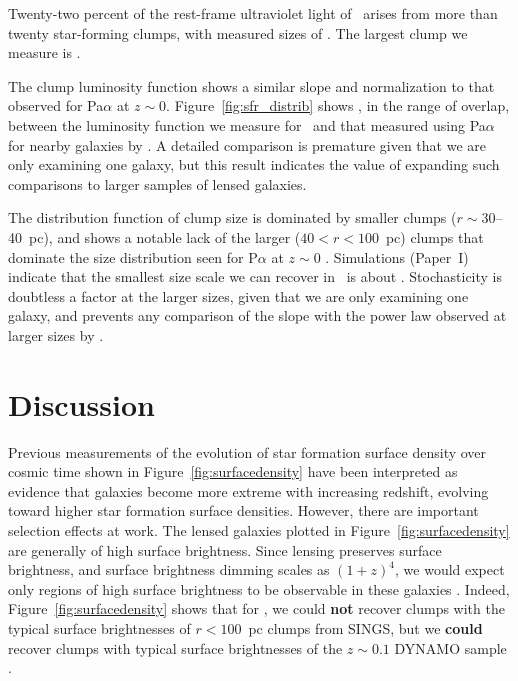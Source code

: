 Twenty-two percent of the rest-frame ultraviolet light of \arcname\ arises from 
more than twenty star-forming clumps, with measured sizes of  \rangeofscales. 
The largest clump we measure is \largestclump.  

The clump luminosity function shows a similar slope 
and normalization to that observed for Pa$\alpha$ at $z\sim0$.  
Figure~\ref{fig:sfr_distrib} shows , 
in the range of overlap, 
between the luminosity function we measure for \arcname\ and that measured
using Pa$\alpha$ for nearby galaxies by \citet{Liu:2013fw}.  A detailed comparison is
premature given that we are only examining one galaxy, but this result
indicates the value of expanding such comparisons to larger samples of lensed galaxies.

 The distribution function of clump size  
is dominated by smaller clumps 
($r\sim 30$--40~pc), and shows a notable lack of the larger ($40<r<100$~pc) clumps 
that dominate the size distribution seen for P$\alpha$ at 
$z\sim0$ \citep{Liu:2013fw}.  
Simulations (Paper~I) indicate that the smallest size scale we can recover in \arcname\ is 
about \smallestscale.
Stochasticity is doubtless a factor at the larger sizes, given that we are only examining one galaxy,
and prevents any comparison of the slope with the power law observed at larger sizes
by \citet{Liu:2013fw}.
 
\section{Discussion}
Previous measurements \citep{Livermore:2012gw, Livermore:2015ck}   
of the evolution of star formation surface density  over cosmic time
shown in Figure~\ref{fig:surfacedensity} 
have been interpreted as evidence that galaxies
become more extreme with increasing redshift, evolving toward 
higher star formation surface densities.  However, there are important selection effects at work.
The lensed galaxies plotted in Figure~\ref{fig:surfacedensity} are generally of high surface brightness.
Since lensing preserves surface brightness, and surface brightness dimming scales as $(1+z)^4$, 
we would expect only regions of high surface brightness to be observable in these galaxies \citep{Calvi:2014bm}.
Indeed,  Figure~\ref{fig:surfacedensity} shows that for \arcname, 
we could {\bf not} recover clumps with the typical surface brightnesses of 
$r<100$~pc clumps from SINGS, but we {\bf could} 
recover clumps with typical surface brightnesses of the $z\sim 0.1$ DYNAMO 
sample \citep{Fisher:2016jp}.

